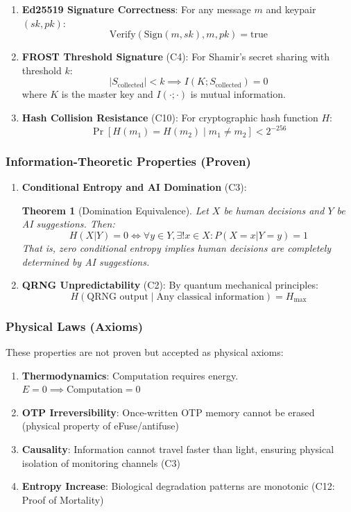 \documentclass[11pt,a4paper]{article}
\newtheorem{theorem}{Theorem}
\begin{document}
\begin{enumerate}
    \item[(1)] \textbf{Ed25519 Signature Correctness}: For any message $m$ and keypair $(sk, pk)$:
    \[
    \text{Verify}(\text{Sign}(m, sk), m, pk) = \text{true}
    \]

    \item[(2)] \textbf{FROST Threshold Signature} (C4): For Shamir's secret sharing with threshold $k$:
    \[
    |S_{\text{collected}}| < k \implies I(K; S_{\text{collected}}) = 0
    \]
    where $K$ is the master key and $I(\cdot;\cdot)$ is mutual information.

    \item[(3)] \textbf{Hash Collision Resistance} (C10): For cryptographic hash function $H$:
    \[
    \Pr[H(m_1) = H(m_2) \mid m_1 \neq m_2] < 2^{-256}
    \]
\end{enumerate}

\subsubsection{Information-Theoretic Properties (Proven)}

\begin{enumerate}
    \item[(1)] \textbf{Conditional Entropy and AI Domination} (C3):
    \begin{theorem}[Domination Equivalence]
    Let $X$ be human decisions and $Y$ be AI suggestions. Then:
    \[
    H(X|Y) = 0 \iff \forall y \in Y, \exists! x \in X: P(X=x|Y=y) = 1
    \]
    That is, zero conditional entropy implies human decisions are completely determined by AI suggestions.
    \end{theorem}

    \item[(2)] \textbf{QRNG Unpredictability} (C2): By quantum mechanical principles:
    \[
    H(\text{QRNG output} \mid \text{Any classical information}) = H_{\max}
    \]
\end{enumerate}

\subsubsection{Physical Laws (Axioms)}

These properties are not proven but accepted as physical axioms:

\begin{enumerate}
    \item[(1)] \textbf{Thermodynamics}: Computation requires energy. $E = 0 \implies \text{Computation} = 0$
    \item[(2)] \textbf{OTP Irreversibility}: Once-written OTP memory cannot be erased (physical property of eFuse/antifuse)
    \item[(3)] \textbf{Causality}: Information cannot travel faster than light, ensuring physical isolation of monitoring channels (C3)
    \item[(4)] \textbf{Entropy Increase}: Biological degradation patterns are monotonic (C12: Proof of Mortality)
\end{enumerate}
\end{document}
